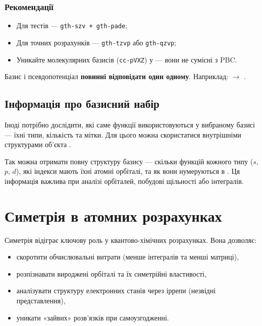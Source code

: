 \subsubsection{Рекомендації}

\begin{itemize}
	\item Для тестів --- \texttt{gth-szv + gth-pade};
	\item Для точних розрахунків --- \texttt{gth-tzvp} або \texttt{gth-qzvp};
	\item Уникайте молекулярних базисів (\texttt{cc-pVXZ}) у  --- вони не сумісні з PBC.
\end{itemize}

\begin{commentbox}[Важливо]
	Базис і псевдопотенціал \textbf{повинні відповідати один одному}.
	Наприклад:  $\rightarrow$ .
\end{commentbox}

\subsection{Інформація про базисний набір}

Іноді потрібно дослідити, які саме функції використовуються у вибраному базисі ---
їхні типи, кількість та мітки. Для цього можна скористатися внутрішніми структурами об’єкта .


Так можна отримати повну структуру базису --- скільки функцій кожного типу ($s$, $p$, $d$),
які індекси мають їхні атомні орбіталі, та як вони нумеруються в \PySCF.
Ця інформація важлива при аналізі орбіталей, побудові щільності або інтегралів.

\section{Симетрія в атомних розрахунках}

Симетрія відіграє ключову роль у квантово-хімічних розрахунках. Вона дозволяє:
\begin{itemize}
	\item скоротити обчислювальні витрати (менше інтегралів та менші матриці),
	\item розпізнавати вироджені орбіталі та їх симетрійні властивості,
	\item аналізувати структуру електронних станів через іррепи (незвідні представлення),
	\item уникати «зайвих» розв’язків при самоузгодженні.
\end{itemize}

